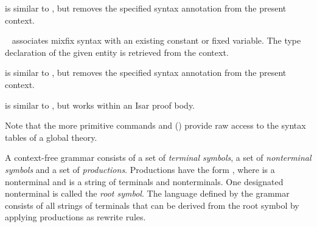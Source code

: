 \begin{isabellebody}
\begin{isamarkuptext}
\begin{description}
  \item \hyperlink{command.no-type-notation}{\mbox{}} is similar to \hyperlink{command.type-notation}{\mbox{}}, but removes the specified syntax annotation from
  the present context.

  \item \hyperlink{command.notation}{\mbox{}}~ associates mixfix
  syntax with an existing constant or fixed variable.  The type
  declaration of the given entity is retrieved from the context.
  
  \item \hyperlink{command.no-notation}{\mbox{}} is similar to \hyperlink{command.notation}{\mbox{}},
  but removes the specified syntax annotation from the present
  context.

  \item \hyperlink{command.write}{\mbox{}} is similar to \hyperlink{command.notation}{\mbox{}}, but
  works within an Isar proof body.

  \end{description}

  Note that the more primitive commands \hyperlink{command.syntax}{\mbox{}} and
  \hyperlink{command.no-syntax}{\mbox{}} () provide raw access
  to the syntax tables of a global theory.%
\end{isamarkuptext}%
\isamarkuptrue%
%
\isamarkuptrue%
%
\isamarkuptrue%
%
\begin{isamarkuptext}%
A context-free grammar consists of a set of \emph{terminal
  symbols}, a set of \emph{nonterminal symbols} and a set of
  \emph{productions}.  Productions have the form ,
  where  is a nonterminal and  is a string of
  terminals and nonterminals.  One designated nonterminal is called
  the \emph{root symbol}.  The language defined by the grammar
  consists of all strings of terminals that can be derived from the
  root symbol by applying productions as rewrite rules.


\end{isamarkuptext}
\end{isabellebody}

